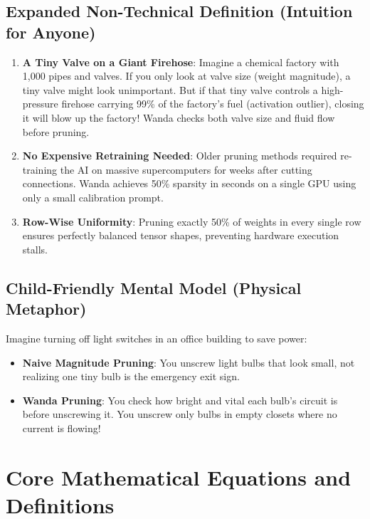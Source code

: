 \documentclass[11pt,a4paper]{article}
\theoremstyle{definition}
\begin{document}
\subsection{Expanded Non-Technical Definition (Intuition for Anyone)}
\begin{enumerate}
    \item \textbf{A Tiny Valve on a Giant Firehose}: Imagine a chemical factory with 1,000 pipes and valves. If you only look at valve size (weight magnitude), a tiny valve might look unimportant. But if that tiny valve controls a high-pressure firehose carrying 99\% of the factory's fuel (activation outlier), closing it will blow up the factory! Wanda checks both valve size and fluid flow before pruning.
    \item \textbf{No Expensive Retraining Needed}: Older pruning methods required re-training the AI on massive supercomputers for weeks after cutting connections. Wanda achieves 50\% sparsity in seconds on a single GPU using only a small calibration prompt.
    \item \textbf{Row-Wise Uniformity}: Pruning exactly 50\% of weights in every single row ensures perfectly balanced tensor shapes, preventing hardware execution stalls.
\end{enumerate}

\subsection{Child-Friendly Mental Model (Physical Metaphor)}
Imagine turning off light switches in an office building to save power:
\begin{itemize}
    \item \textbf{Naive Magnitude Pruning}: You unscrew light bulbs that look small, not realizing one tiny bulb is the emergency exit sign.
    \item \textbf{Wanda Pruning}: You check how bright and vital each bulb's circuit is before unscrewing it. You unscrew only bulbs in empty closets where no current is flowing!
\end{itemize}

\section{Core Mathematical Equations and Definitions}
\end{document}
